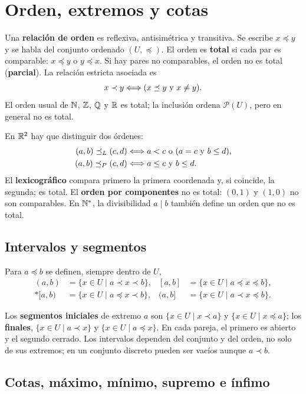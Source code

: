 \section{Orden, extremos y cotas}
\label{sec:orden}

Una \textbf{relación de orden} es reflexiva, antisimétrica y transitiva.
Se escribe $x\preceq y$ y se habla del conjunto ordenado $(U,\preceq)$.
El orden es \textbf{total} si cada par es comparable:
$x\preceq y$ o $y\preceq x$. Si hay pares no comparables, el orden
no es total (\textbf{parcial}).
La relación estricta asociada es
\[
 x\prec y\Longleftrightarrow(x\preceq y\ \text{y}\ x\ne y).
\]
El orden usual de $\mathbb{N}$, $\mathbb{Z}$, $\mathbb{Q}$ y $\mathbb{R}$ es total;
la inclusión ordena $\mathcal P(U)$, pero en general no es total.

En $\mathbb{R}^2$ hay que distinguir dos órdenes:
\begin{align*}
 (a,b)\preceq_L(c,d)
   &\Longleftrightarrow a<c\ \text{o}\ (a=c\ \text{y}\ b\le d),\\
 (a,b)\preceq_P(c,d)
   &\Longleftrightarrow a\le c\ \text{y}\ b\le d.
\end{align*}
El \textbf{lexicográfico} compara primero la primera coordenada y,
si coincide, la segunda; es total. El \textbf{orden por componentes}
no es total: $(0,1)$ y $(1,0)$ no son comparables.
En $\mathbb{N}^*$, la divisibilidad $a\mid b$ también define un orden
que no es total.

\begin{samepage}
\subsection*{Intervalos y segmentos}

Para $a\preceq b$ se definen, siempre dentro de $U$,
\begin{align*}
 (a,b)&=\{x\in U\mid a\prec x\prec b\},&
 [a,b]&=\{x\in U\mid a\preceq x\preceq b\},\\*
 [a,b)&=\{x\in U\mid a\preceq x\prec b\},&
 (a,b]&=\{x\in U\mid a\prec x\preceq b\}.
\end{align*}
\end{samepage}
Los \textbf{segmentos iniciales} de extremo $a$ son
$\{x\in U\mid x\prec a\}$ y $\{x\in U\mid x\preceq a\}$;
los \textbf{finales}, $\{x\in U\mid a\prec x\}$ y
$\{x\in U\mid a\preceq x\}$. En cada pareja, el primero es abierto
y el segundo cerrado. Los intervalos dependen del conjunto y del orden,
no solo de sus extremos; en un conjunto discreto pueden ser vacíos
aunque $a\prec b$.

\subsection*{Cotas, máximo, mínimo, supremo e ínfimo}
\label{sec:cotas}

